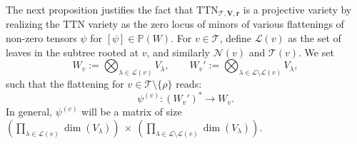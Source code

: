 \documentclass[12pt]{article}
\theoremstyle{definition}
\numberwithin{theorem}{section}
\newcommand{\PP}{\mathbb{P}}
\begin{document}
The next proposition justifies the fact that $\mathrm{TTN}_{\mathscr T, \mathbf{V}, \mathbf{r}}$ is a projective variety by realizing the $\mathrm{TTN}$ variety as the zero locus of minors of various flattenings of non-zero tensors $\psi$ for $ [\psi] \in \PP(W)$. 
For $v\in \mathscr T$, define $\mathscr L(v)$
as the set of leaves in the subtree rooted at $v$, and similarly $\mathscr{N}(v)$ and $\mathscr{T}(v)$. We set 
\[
W_v:=\bigotimes_{\lambda\in\mathscr L(v)}V_\lambda,
\qquad
W_v':=\bigotimes_{\lambda \in \mathscr{L} \setminus\mathscr L(v)}V_\lambda,
\]
such that the flattening for $v \in \mathscr T \setminus \{\rho\}$ reads:
\begin{equation} \label{eq:flattening}
    \psi^{(v)}: \left(W_v' \right)^* \to  W_v.
\end{equation}
In general, $\psi^{(v)}$ will be
a matrix of size $\left(\prod_{\lambda \in \mathscr{L}(v)} \dim(V_\lambda)\right) ~\times~\left(\prod_{\lambda \in \mathscr{L} \setminus \mathscr{L}(v)} \dim(V_\lambda)\right)$.
\end{document}
